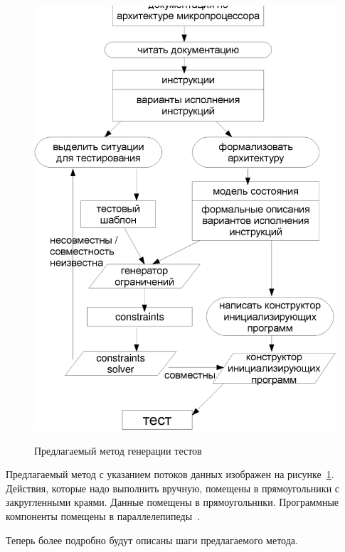 \begin{figure}[p] \center
  \includegraphics[width=\textwidth]{2.theor/process_full}\\
  \caption{Предлагаемый метод генерации тестов}\label{process}
\end{figure}

Предлагаемый метод с указанием потоков данных изображен на
рисунке~\ref{process}. Действия, которые надо выполнить вручную, помещены в
прямоугольники с закругленными краями. Данные помещены в прямоугольники.
Программные компоненты помещены в параллелепипеды~\cite{my_lomonosov_2009, my_miet_2009}.

Теперь более подробно будут описаны шаги предлагаемого метода.

